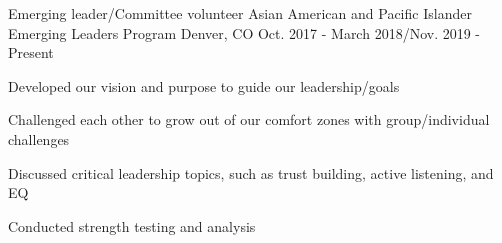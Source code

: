 


\begin{cventries}


\vspace{-.25em}
\cventry
{Emerging leader/Committee volunteer} %
{Asian American and Pacific Islander Emerging Leaders Program} %
{Denver, CO} %
{Oct. 2017 - March 2018/Nov. 2019 - Present} %
{ %
\begin{cvitems}
\item {Developed our vision and purpose to guide our leadership/goals}
\item {Challenged each other to grow out of our comfort zones with group/individual challenges}
\item {Discussed critical leadership topics, such as trust building, active listening, and EQ}
\item {Conducted strength testing and analysis}
\end{cvitems}
}




\end{cventries}
